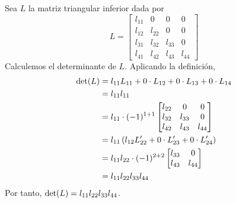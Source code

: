 \begin{example}
    Sea $L$ la matriz triangular inferior dada por
    $$L = \begin{bmatrix}
        l_{11} & 0 & 0 & 0 \\
        l_{12} & l_{22} & 0 & 0 \\
        l_{31} & l_{32} & l_{33} & 0 \\
        l_{41} & l_{42} & l_{43} & l_{44}
    \end{bmatrix}$$\newpage\noindent
    Calculemos el determinante de $L$. Aplicando la definición,
    \begin{align*}
        \operatorname{det}(L)  & = l_{11}L_{11} + 0 \cdot L_{12} + 0 \cdot L_{13} + 0 \cdot L_{14} \\
        & = l_{11}l_{11} \\
        & = l_{11} \cdot (-1)^{1+1} \begin{bmatrix}
            l_{22} & 0 & 0 \\
            l_{32} & l_{33} & 0 \\
            l_{42} & l_{43} & l_{44}
        \end{bmatrix} \\
        & = l_{11} \left( l_{12}L_{22}^{\prime} + 0 \cdot L_{23}^{\prime} + 0 \cdot L_{24}^{\prime} \right) \\
        & = l_{11}l_{22} \cdot (-1)^{2+2} \begin{bmatrix}
            l_{33} & 0 \\
            l_{43} & l_{44}
        \end{bmatrix} \\
        & = l_{11}l_{22}l_{33}l_{44}
    \end{align*}
    Por tanto, $\operatorname{det}(L) = l_{11}l_{22}l_{33}l_{44}$.
\end{example}

